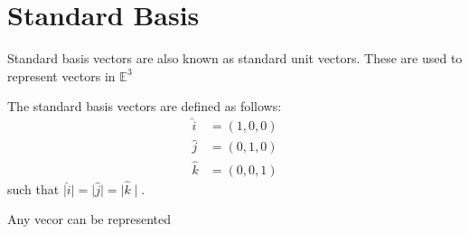 \section{Standard Basis}
Standard basis vectors are also known as standard unit vectors. These are used to represent vectors in $\mathbb{E}^3$

\begin{definition}
  The standard basis vectors are defined as follows:
  \begin{align*}
    \hat{i} &= (1, 0, 0 ) \\
    \hat{j} &=  (0, 1, 0) \\
    \hat{k} &=  (0, 0, 1)
  \end{align*}
such that $\mid \hat{i} \mid = \mid \hat{j} \mid = \mid \hat{k} \mid.$ 
\end{definition}

Any vecor can be represented
